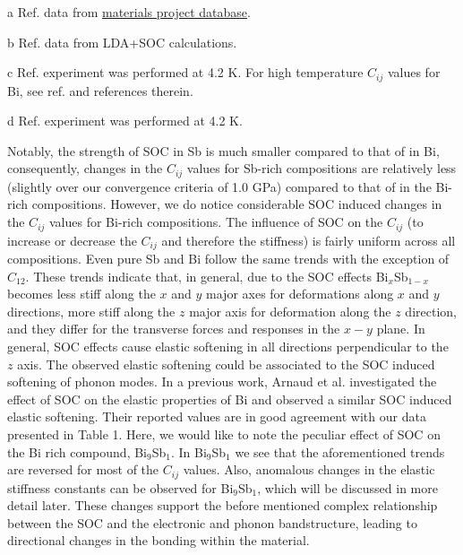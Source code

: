 \documentclass[twocolumn,superscriptaddress,nofootinbib,floatfix,aps,showpacs,prb,citeautoscript,reprint]{revtex4-1}
\begin{document}
\begin{table*}[hbt!]
\begin{adjustbox}{width=1.0\textwidth, center=\textwidth }
\begin{threeparttable}
\begin{tabular}{lrrrrrrrrrrrrrr}
\hline
\end{tabular}
    \begin{tablenotes}
         \item[a] Ref.\cite{Jong2015} data from \href{https://materialsproject.org}{materials project database}.
         \item[b] Ref.\cite{ArnaudPRB2016} data from LDA+SOC calculations. 
         \item[c] Ref.\cite{Lichnowski1976} experiment was performed at 4.2 K. For high temperature $C_{ij}$ values for Bi, see ref.\cite{Lichnowski1976} and references therein.
         \item[d] Ref.\cite{Eckstein1960} experiment was performed at 4.2 K. 
     \end{tablenotes}
 \end{threeparttable} 
\end{adjustbox}
\end{table*} 

Notably, the strength of SOC in Sb is much smaller compared to that of in Bi, consequently, changes in the $C_{ij}$ values for Sb-rich compositions are relatively less (slightly over our convergence criteria of 1.0 GPa) compared to that of in the Bi-rich compositions. However, we do notice considerable SOC induced changes in the $C_{ij}$ values for Bi-rich compositions. The influence of SOC on the $C_{ij}$ (to increase or decrease the $C_{ij}$ and therefore the stiffness) is fairly uniform across all compositions. Even pure Sb and Bi follow the same trends with the exception of $C_{12}$. These trends indicate that, in general, due to the SOC effects Bi$_{x}$Sb$_{1-x}$ becomes less stiff along the $x$ and $y$ major axes for deformations along $x$ and $y$ directions, more stiff along the $z$ major axis for deformation along the $z$ direction, and they differ for the transverse forces and responses in the $x-y$ plane. In general, SOC effects cause elastic softening in all directions perpendicular to the $z$ axis. The observed elastic softening could be associated to the SOC induced softening of phonon modes. \cite{BiSOC_PRB2007} In a previous work, Arnaud et al.\cite{ArnaudPRB2016} investigated the effect of SOC on the elastic properties of Bi and observed a similar SOC induced elastic softening. Their reported values are in good agreement with our data presented in Table 1. Here, we would like to note the peculiar effect of SOC on the Bi rich compound, Bi$_{9}$Sb$_{1}$. In Bi$_{9}$Sb$_{1}$ we see that the aforementioned trends are reversed for most of the $C_{ij}$ values. Also, anomalous changes in the elastic stiffness constants can be observed for Bi$_{9}$Sb$_{1}$, which will be discussed in more detail later. These changes support the before mentioned complex relationship between the SOC and the electronic and phonon bandstructure, leading to directional changes in the bonding within the material.
\end{document}
